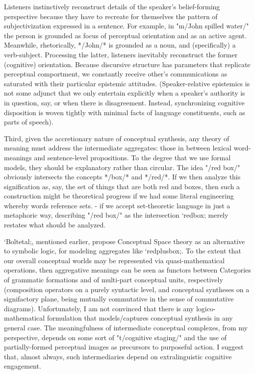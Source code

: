 Listeners instinctively reconstruct details of the speaker's 
belief-forming perspective because they have to recreate 
for themselves the pattern of subjectivization expressed in a sentence.  
For example, in "m/John spilled water/" the person is grounded as 
focus of perceptual orientation and as an active agent.  Meanwhile, 
rhetorically, */John/* is grounded as a noun, and (specifically) a verb-subject.  
Processing the latter, listeners inevitably reconstruct 
the former (cognitive) orientation.  
Because discursive structure has parameters that replicate 
perceptual comportment, we constantly receive other's communications 
as saturated with their particular epistemic attitudes.  
(Speaker-relative epistemics is not some adjunct that we only 
entertain explicitly when a speaker's authority is in question, 
say, or when there is disagreement.  Instead, synchronizing 
cognitive disposition is woven tightly with minimal 
facts of language constituents, such as parts of speech).

Third, given the accretionary nature of conceptual synthesis, 
any theory of meaning must address the intermediate 
aggregates: those in between lexical word-meanings and sentence-level 
propositions.  To the degree that we use formal models, 
they should be explanatory rather than circular.  
The idea "/red box/" obviously intersects the 
concepts */box/* and */red/*.  If we then analyze this 
signification as, say, the set of things that are both 
red and boxes, then such a construction might be 
theoretical progress if we had some literal engineering 
whereby words reference sets.  -%
if we accept set-theoretic 
language in just a metaphoric way, describing 
"/red box/" as the intersection `redbox; merely restates what 
should be analyzed.

`Boltetal;, mentioned earlier, propose Conceptual Space theory 
as an alternative to symbolic logic, for modeling 
aggregates like `redplusbox;.  To the extent that 
our overall conceptual worlds may be represented via 
quasi-mathematical operations, then aggregative meanings 
can be seen as functors between Categories of grammatic 
formations and of multi-part conceptual units, respectively  
(composition operators on a purely syntactic level, 
and conceptual syntheses on a signifactory plane, 
being mutually commutative in the sense of 
commutative diagrams).  Unfortunately, I am not 
convinced that there is any logico-mathematical 
formulation that models/captures conceptual 
synthesis in any general case.  The meaningfulness 
of intermediate conceptual complexes, from my 
perspective, depends on some sort of 
"t/cognitive staging/" and the use of partially-formed 
perceptual images as precursors to purposeful action.  
I suggest that, almost always, such intermediaries 
depend on extralinguistic cognitive engagement.

